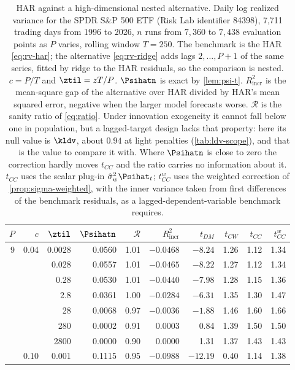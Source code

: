 \begin{table}[htbp]
\centering
\caption{HAR against a high-dimensional nested alternative. Daily log realized variance for the SPDR S\&P 500 ETF (Risk Lab identifier 84398), 7,711 trading days from 1996 to 2026, $n$ runs from $7,360$ to $7,438$ evaluation points as $P$ varies, rolling window $T=250$. The benchmark is the HAR \eqref{eq:rv-har}; the alternative \eqref{eq:rv-ridge} adds lags $2,\dots,P+1$ of the same series, fitted by ridge to the HAR residuals, so the comparison is nested. $c=P/T$ and $\ztil=zT/P$. $\Psihatn$ is exact by \cref{lem:psi-t}. $R^2_{\text{incr}}$ is the mean-square gap of the alternative over HAR divided by HAR's mean squared error, negative when the larger model forecasts worse. $\mathcal R$ is the sanity ratio of \eqref{eq:ratio}. Under innovation exogeneity it cannot fall below one in population, but a lagged-target design lacks that property: here its null value is $\kldv$, about $0.94$ at light penalties (\cref{tab:ldv-scope}), and that is the value to compare it with. Where $\Psihatn$ is close to zero the correction hardly moves $t_{CC}$ and the ratio carries no information about it. $t_{CC}$ uses the scalar plug-in $\hat\sigma^2_w\Psihat_t$; $t_{CC}^{w}$ uses the weighted correction of \cref{prop:sigma-weighted}, with the inner variance taken from first differences of the benchmark residuals, as a lagged-dependent-variable benchmark requires.}
\label{tab:rv-main}
\small
\begin{tabular}{rrrrrrrrrr}
\toprule
$P$ & $c$ & $\ztil$ & $\Psihatn$ & $\mathcal R$ & $R^2_{\text{incr}}$ & $t_{DM}$ & $t_{CW}$ & $t_{CC}$ & $t_{CC}^{w}$ \\
\midrule
9 & 0.04 & 0.0028 & 0.0560 & 1.01 & $-0.0468$ & $-8.24$ & 1.26 & 1.12 & 1.34 \\
 &  & 0.028 & 0.0557 & 1.01 & $-0.0465$ & $-8.22$ & 1.27 & 1.12 & 1.34 \\
 &  & 0.28 & 0.0530 & 1.01 & $-0.0440$ & $-7.98$ & 1.28 & 1.15 & 1.36 \\
 &  & 2.8 & 0.0361 & 1.00 & $-0.0284$ & $-6.31$ & 1.35 & 1.30 & 1.47 \\
 &  & 28 & 0.0068 & 0.97 & $-0.0036$ & $-1.88$ & 1.46 & 1.60 & 1.66 \\
 &  & 280 & 0.0002 & 0.91 & 0.0003 & 0.84 & 1.39 & 1.50 & 1.50 \\
 &  & 2800 & 0.0000 & 0.90 & 0.0000 & 1.31 & 1.37 & 1.43 & 1.43 \\
\addlinespace
24 & 0.10 & 0.001 & 0.1115 & 0.95 & $-0.0988$ & $-12.19$ & 0.40 & 1.14 & 1.38 \\

\end{tabular}
\end{table}

